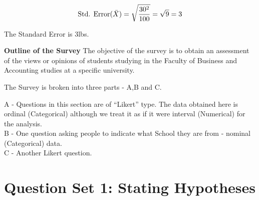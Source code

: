 \documentclass[]{report}
\begin{document}
\vspace{0.1cm}
\[
\mbox{Std. Error}(\bar{X})  = \sqrt{{30^2\over 100}} = \sqrt{9}
= 3\]

\vspace{0.1cm}

The Standard Error is 3lbs.



\noindent  \textbf{Outline of the Survey}
The objective of the survey is to obtain an assessment of the views or opinions of students studying in the Faculty of Business and Accounting studies at a specific university.

\vspace{0.4cm}

The Survey is broken into three parts - A,B and C. \\ \vspace{0.2cm}

A - Questions in this section are of ``Likert'' type. The data obtained here is ordinal (Categorical) although we treat it as if it were interval (Numerical) for the analysis.\\
\vspace{0.2cm}
B - One question asking people to indicate what School they are from - nominal (Categorical) data.\\
\vspace{0.2cm}
C - Another Likert question.




\newpage	
\section*{Question Set 1: Stating Hypotheses}
\end{document}
